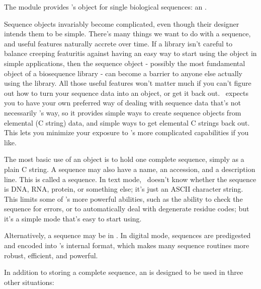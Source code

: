 The  module provides \Easel's object for single biological
sequences: an .

Sequence objects invariably become complicated, even though their
designer intends them to be simple. There's many things we want to do
with a sequence, and useful features naturally accrete over time. If a
library isn't careful to balance creeping featuritis against having an
easy way to start using the object in simple applications, then the
sequence object - possibly the most fundamental object of a
biosequence library - can become a barrier to anyone else actually
using the library. All those useful features won't matter much if you
can't figure out how to turn your sequence data into an object, or get
it back out. \Easel\ expects you to have your own preferred way of
dealing with sequence data that's not necessarily \Easel's way, so it
provides simple ways to create sequence objects from elemental (C
string) data, and simple ways to get elemental C strings back out.
This lets you minimize your exposure to \Easel's more complicated
capabilities if you like.

The most basic use of an  object is to hold one
complete sequence, simply as a plain C string. A sequence may also
have a name, an accession, and a description line.  This is called a
 sequence. In text mode, \Easel\ doesn't know
whether the sequence is DNA, RNA, protein, or something else; it's
just an ASCII character string. This limits some of \Easel's more
powerful abilities, such as the ability to check the sequence for
errors, or to automatically deal with degenerate residue codes; but
it's a simple mode that's easy to start using.

Alternatively, a sequence may be in . In digital
mode, sequences are predigested and encoded into \Easel's internal
format, which makes many sequence routines more robust, efficient, and
powerful.

In addition to storing a complete sequence, an  is
designed to be used in three other situations:

